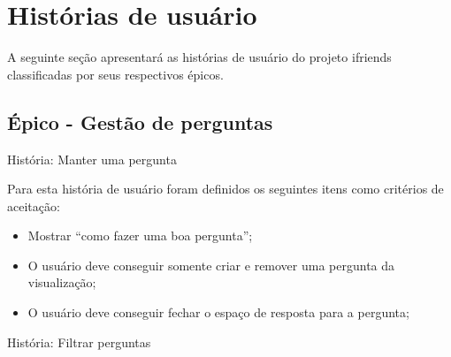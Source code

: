 \chapter{Histórias de usuário}
\label{historias de usuario}
A seguinte seção apresentará as histórias de usuário do projeto \gls{ifriends} classificadas por seus respectivos épicos.

\section{Épico - Gestão de perguntas}
\label{gestão_perguntas}
\def\arraystretch{2}
\begin{quadro}[htb]
\centering
\ABNTEXfontereduzida
\caption[História: Manter uma pergunta]{História: Manter uma pergunta}
\end{quadro}
\FloatBarrier 

Para esta história de usuário foram definidos os seguintes itens como critérios de aceitação:

\begin{itemize}
\item Mostrar ``como fazer uma boa pergunta'';
\item O usuário deve conseguir somente criar e remover uma pergunta da visualização;
\item O usuário deve conseguir fechar o espaço de resposta para a pergunta;
\end{itemize}

\def\arraystretch{2}
\begin{quadro}[htb]
\centering
\ABNTEXfontereduzida
\caption[História: Filtrar perguntas]{História: Filtrar perguntas}
\end{quadro}
\FloatBarrier 


